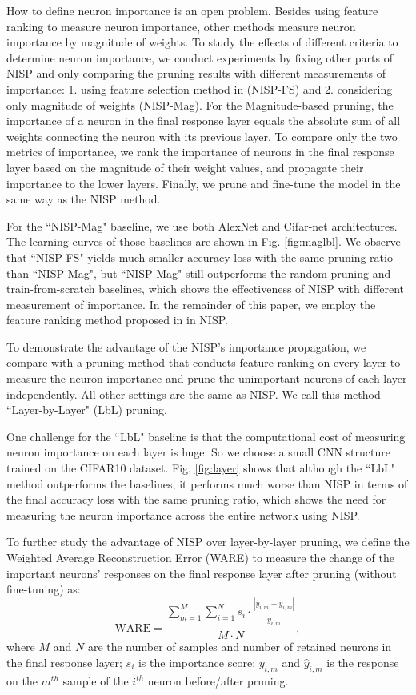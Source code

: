 \documentclass[10pt,twocolumn,letterpaper]{article}
\begin{document}
How to define neuron importance is an open problem. Besides using feature ranking to measure neuron importance, other methods \cite{pruneweigth,thinet,DeepCompress} measure neuron importance by magnitude of weights. To study the effects of different criteria to determine neuron importance, we conduct experiments by fixing other parts of NISP and only comparing the pruning results with different measurements of importance: 1. using feature selection method in \cite{Roffo_2015_ICCV} (NISP-FS) and 2. considering only magnitude of weights (NISP-Mag).
For the Magnitude-based pruning, the importance of a neuron in the final response layer equals the absolute sum of all weights connecting the neuron with its previous layer. To compare only the two metrics of importance, we rank the importance of neurons in the final response layer based on the magnitude of their weight values, and propagate their importance to the lower layers. Finally, we prune and fine-tune the model in the same way as the NISP method. 

For the ``NISP-Mag" baseline, we use both AlexNet and Cifar-net architectures. The learning curves of those baselines are shown in Fig. \ref{fig:maglbl}. We observe that ``NISP-FS" yields much smaller accuracy loss with the same pruning ratio than ``NISP-Mag", but ``NISP-Mag" still outperforms the random pruning and train-from-scratch baselines, which shows the effectiveness of NISP with different measurement of importance. In the remainder of this paper, we employ the feature ranking method proposed in \cite{Roffo_2015_ICCV} in NISP.

To demonstrate the advantage of the NISP's importance propagation, we compare with a pruning method that conducts feature ranking on every layer to measure the neuron importance and prune the unimportant neurons of each layer independently. All other settings are the same as NISP. We call this method ``Layer-by-Layer"  (LbL) pruning.
  
One challenge for the ``LbL" baseline is that the computational cost of measuring neuron importance on each layer is huge. So we choose a small CNN structure trained on the CIFAR10 dataset. 
Fig. \ref{fig:layer} shows that although the ``LbL" method outperforms the baselines, it performs much worse than NISP in terms of the final accuracy loss with the same pruning ratio, which shows the need for measuring the neuron importance across the entire network using NISP.

To further study the advantage of NISP over layer-by-layer pruning, we define the Weighted Average Reconstruction Error (WARE) to measure the change of the important neurons' responses on the final response layer after pruning (without fine-tuning) as:
\begin{equation}
\text{WARE} = \frac{\sum_{m=1}^{M} \sum_{i=1}^{N} s_{i}\cdot \frac{|{\hat y}_{i,m}- y_{i,m}|}{|y_{i,m}|}}{M \cdot N},
\end{equation}
where $M$ and $N$ are the number of samples and number of retained neurons in the final response layer; $s_i$ is the importance score; $y_{i,m}$ and ${\hat y}_{i,m}$ is the response on the $m^{th}$ sample of the $i^{th}$ neuron before/after pruning. 
\end{document}

